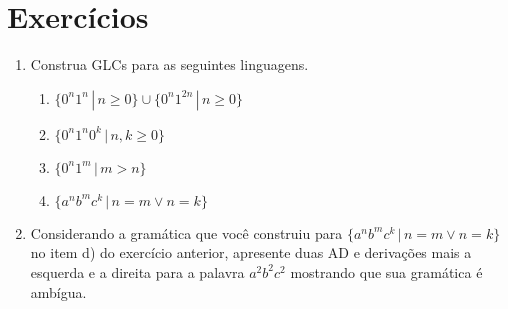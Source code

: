\documentclass[a4paper]{article}
\theoremstyle{definition}
\begin{document}
  \section{Exercícios} 

  \begin{enumerate}
     \item Construa GLCs para as seguintes linguagens.
       \begin{enumerate}
       \item $\{0^n1^n\,|\,n\geq 0\} \cup \{0^n1^{2n}\,|\,n\geq 0\}$
       \item $\{0^n1^n0^k\,|\,n,k \geq 0\}$
       \item $\{0^n1^m\,|\,m > n\}$
       \item $\{a^nb^mc^k\,|\,n = m \lor n = k\}$
       \end{enumerate}
     \item Considerando a gramática que você construiu para $\{a^nb^mc^k\,|\,n =
       m \lor n = k\}$ no item d) do exercício anterior, apresente duas AD e 
       derivações mais a esquerda e a
       direita para a palavra $a^2b^2c^2$ mostrando que sua gramática é ambígua.
  \end{enumerate}
\end{document}
